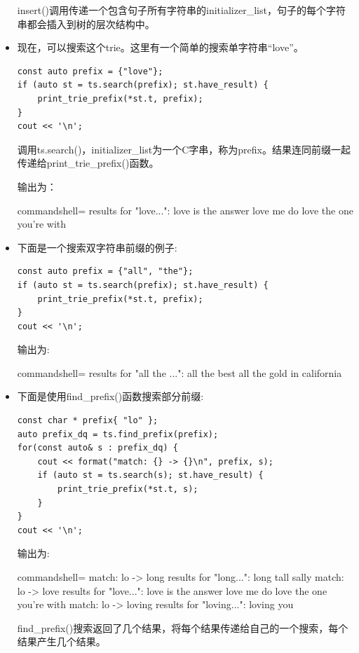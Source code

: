 \begin{itemize}
insert()调用传递一个包含句子所有字符串的initializer\_list，句子的每个字符串都会插入到树的层次结构中。

\item 
现在，可以搜索这个trie。这里有一个简单的搜索单字符串“love”。

\begin{lstlisting}[style=styleCXX]
const auto prefix = {"love"};
if (auto st = ts.search(prefix); st.have_result) {
	print_trie_prefix(*st.t, prefix);
}
cout << '\n';
\end{lstlisting}

调用ts.search()，initializer\_list为一个C字串，称为prefix。结果连同前缀一起传递给print\_trie\_prefix()函数。

输出为：

\begin{tcblisting}{commandshell={}}
results for "love...":
love is the answer
love me do
love the one you're with
\end{tcblisting}

\item
下面是一个搜索双字符串前缀的例子:

\begin{lstlisting}[style=styleCXX]
const auto prefix = {"all", "the"};
if (auto st = ts.search(prefix); st.have_result) {
	print_trie_prefix(*st.t, prefix);
}
cout << '\n';
\end{lstlisting}

输出为:

\begin{tcblisting}{commandshell={}}
results for "all the ...":
all the best
all the gold in california
\end{tcblisting}

\item
下面是使用find\_prefix()函数搜索部分前缀:

\begin{lstlisting}[style=styleCXX]
const char * prefix{ "lo" };
auto prefix_dq = ts.find_prefix(prefix);
for(const auto& s : prefix_dq) {
	cout << format("match: {} -> {}\n", prefix, s);
	if (auto st = ts.search(s); st.have_result) {
		print_trie_prefix(*st.t, s);
	}
}
cout << '\n';
\end{lstlisting}

输出为:

\begin{tcblisting}{commandshell={}}
match: lo -> long
results for "long...":
long tall sally
match: lo -> love
results for "love...":
love is the answer
love me do
love the one you're with
match: lo -> loving
results for "loving...":
loving you
\end{tcblisting}

find\_prefix()搜索返回了几个结果，将每个结果传递给自己的一个搜索，每个结果产生几个结果。

\end{itemize}


